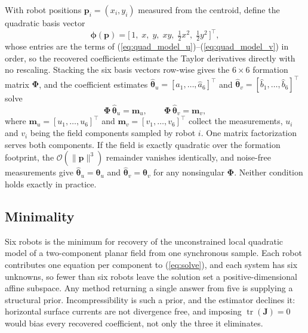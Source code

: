 \documentclass[lettersize,journal]{IEEEtran}
\begin{document}
With robot positions $\mathbf{p}_i = (x_i, y_i)$ measured from the
centroid, define the quadratic basis vector
\begin{equation}
    \boldsymbol{\phi}(\mathbf{p}) =
    \bigl[\,1, \; x, \; y, \; xy, \;
    \tfrac{1}{2}x^2, \; \tfrac{1}{2}y^2\,\bigr]^\top,
\end{equation}
whose entries are the terms of
(\ref{eq:quad_model_u})--(\ref{eq:quad_model_v}) in order, so
the recovered coefficients estimate the Taylor derivatives directly with
no rescaling. Stacking the six basis vectors row-wise gives
the $6 \times 6$ formation matrix $\boldsymbol{\Phi}$, and the coefficient
estimates $\hat{\boldsymbol{\theta}}_u = [\hat{a}_1, \ldots,
\hat{a}_6]^\top$ and $\hat{\boldsymbol{\theta}}_v = [\hat{b}_1, \ldots,
\hat{b}_6]^\top$ solve
\begin{equation}
    \boldsymbol{\Phi}\,\hat{\boldsymbol{\theta}}_u = \mathbf{m}_u, \qquad
    \boldsymbol{\Phi}\,\hat{\boldsymbol{\theta}}_v = \mathbf{m}_v,
    \label{eq:solve}
\end{equation}
where $\mathbf{m}_u = [u_1, \ldots, u_6]^\top$ and
$\mathbf{m}_v = [v_1, \ldots, v_6]^\top$ collect the measurements, $u_i$
and $v_i$ being the field components sampled by robot $i$. One matrix
factorization serves both components. If the field is exactly quadratic
over the formation footprint, the $\mathcal{O}(\|\mathbf{p}\|^3)$
remainder vanishes identically, and noise-free measurements give
$\hat{\boldsymbol{\theta}}_u = \boldsymbol{\theta}_u$ and
$\hat{\boldsymbol{\theta}}_v = \boldsymbol{\theta}_v$ for any nonsingular
$\boldsymbol{\Phi}$. Neither condition holds exactly in practice.

\subsection{Minimality}

Six robots is the minimum for recovery of the unconstrained local
quadratic model of a two-component planar field from one synchronous
sample. Each robot contributes one equation per component to
(\ref{eq:solve}), and each system has six unknowns, so fewer than six
robots leave the solution set a positive-dimensional affine subspace.
Any method returning a single answer from five is supplying a structural
prior. Incompressibility is such a prior, and the estimator declines it:
horizontal surface currents are not divergence free, and imposing
$\operatorname{tr}(\mathbf{J}) = 0$ would bias every recovered
coefficient, not only the three it eliminates.
\end{document}
